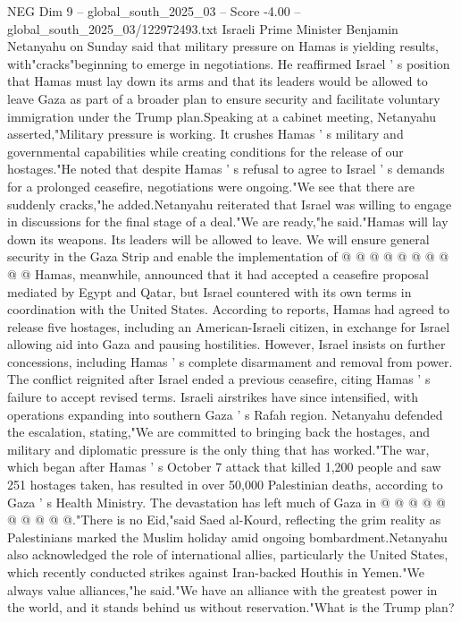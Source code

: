 \begin{textsample}{NEG Dim 9 – global\_south\_2025\_03 – Score -4.00 – global\_south\_2025\_03/122972493.txt}  \label{ex:f9_neg_316}
Israeli Prime Minister Benjamin Netanyahu on Sunday said that military pressure on Hamas is yielding results, with"cracks"beginning to emerge in negotiations.
He reaffirmed Israel ' s position that Hamas must lay down its arms and that its leaders would be allowed to leave Gaza as part of a broader plan to ensure security and facilitate voluntary immigration under the Trump plan.Speaking at a cabinet meeting, Netanyahu asserted,"Military pressure is working.
It crushes Hamas ' s military and governmental capabilities while creating conditions for the release of our hostages."He noted that despite Hamas ' s refusal to agree to Israel ' s demands for a prolonged ceasefire, negotiations were ongoing."We see that there are suddenly cracks,"he added.Netanyahu reiterated that Israel was willing to engage in discussions for the final stage of a deal."We are ready,"he said."Hamas will lay down its weapons.
Its leaders will be allowed to leave.
We will ensure general security in the Gaza Strip and enable the implementation of @ @ @ @ @ @ @ @ @ @ Hamas, meanwhile, announced that it had accepted a ceasefire proposal mediated by Egypt and Qatar, but Israel countered with its own terms in coordination with the United States.
According to reports, Hamas had agreed to release five hostages, including an American-Israeli citizen, in exchange for Israel allowing aid into Gaza and pausing hostilities.
However, Israel insists on further concessions, including Hamas ' s complete disarmament and removal from power.
The conflict reignited after Israel ended a previous ceasefire, citing Hamas ' s failure to accept revised terms.
Israeli airstrikes have since intensified, with operations expanding into southern Gaza ' s Rafah region.
Netanyahu defended the escalation, stating,"We are committed to bringing back the hostages, and military and diplomatic pressure is the only thing that has worked."The war, which began after Hamas ' s October 7 attack that killed 1,200 people and saw 251 hostages taken, has resulted in over 50,000 Palestinian deaths, according to Gaza ' s Health Ministry.
The devastation has left much of Gaza in @ @ @ @ @ @ @ @ @ @."There is no Eid,"said Saed al-Kourd, reflecting the grim reality as Palestinians marked the Muslim holiday amid ongoing bombardment.Netanyahu also acknowledged the role of international allies, particularly the United States, which recently conducted strikes against Iran-backed Houthis in Yemen."We always value alliances,"he said."We have an alliance with the greatest power in the world, and it stands behind us without reservation."What is the Trump plan?

\end{textsample}
